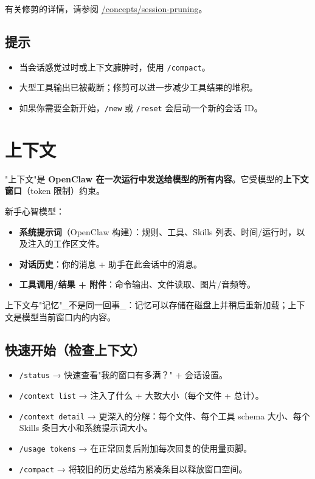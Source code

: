 有关修剪的详情，请参阅 \href{/concepts/session-pruning}{/concepts/session-pruning}。

\subsection{提示}


\begin{itemize}
  \item 当会话感觉过时或上下文臃肿时，使用 \texttt{/compact}。
  \item 大型工具输出已被截断；修剪可以进一步减少工具结果的堆积。
  \item 如果你需要全新开始，\texttt{/new} 或 \texttt{/reset} 会启动一个新的会话 ID。
\end{itemize}



\clearpage

\section{上下文}


"上下文"是 \textbf{OpenClaw 在一次运行中发送给模型的所有内容}。它受模型的\textbf{上下文窗口}（token 限制）约束。

新手心智模型：

\begin{itemize}
  \item \textbf{系统提示词}（OpenClaw 构建）：规则、工具、Skills 列表、时间/运行时，以及注入的工作区文件。
  \item \textbf{对话历史}：你的消息 + 助手在此会话中的消息。
  \item \textbf{工具调用/结果 + 附件}：命令输出、文件读取、图片/音频等。
\end{itemize}


上下文与"记忆"\_不是同一回事\_：记忆可以存储在磁盘上并稍后重新加载；上下文是模型当前窗口内的内容。

\subsection{快速开始（检查上下文）}


\begin{itemize}
  \item \texttt{/status} → 快速查看"我的窗口有多满？" + 会话设置。
  \item \texttt{/context list} → 注入了什么 + 大致大小（每个文件 + 总计）。
  \item \texttt{/context detail} → 更深入的分解：每个文件、每个工具 schema 大小、每个 Skills 条目大小和系统提示词大小。
  \item \texttt{/usage tokens} → 在正常回复后附加每次回复的使用量页脚。
  \item \texttt{/compact} → 将较旧的历史总结为紧凑条目以释放窗口空间。
\end{itemize}


